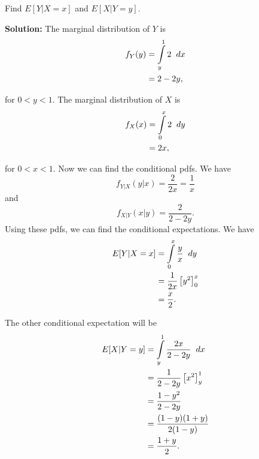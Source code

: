 \documentclass{article}
\newcommand{\mybox}{%
    \collectbox{%
        \setlength{\fboxsep}{1pt}%
        \fbox{\BOXCONTENT}%
    }%
}
\begin{document}
Find $E[Y|X=x]$ and $E[X|Y=y]$.

\vspace{5mm}

\noindent\mybox{\textbf{Solution:}}  The marginal distribution of $Y$ is
\begin{align}
f_Y(y) &= \int\limits_y^1 2 \hspace{2mm}dx \\
&= 2 - 2y,
\end{align}

\noindent for $0<y<1$.  The marginal distribution of $X$ is 
\begin{align}
f_X(x) &= \int\limits_0^x 2 \hspace{2mm} dy \\
&= 2x,
\end{align}

\noindent for $0<x<1$.  Now we can find the conditional pdfs.  We have $$f_{Y|X}(y|x) = \frac{2}{2x} = \frac{1}{x}$$ and $$f_{X|Y}(x|y) = \frac{2}{2-2y}.$$  Using these pdfs, we can find the conditional expectations.  We have
\begin{align}
E[Y|X=x] &= \int\limits_0^x \frac{y}{x} \hspace{2mm} dy \\
&= \frac{1}{2x}\left[y^2\right]^x_0 \\
&= \frac{x}{2}.
\end{align}

\noindent The other conditional expectation will be 
\begin{align}
E[X|Y=y] &= \int\limits_y^1 \frac{2x}{2-2y} \hspace{2mm} dx \\
&= \frac{1}{2-2y}\left[x^2\right]^1_y \\
&= \frac{1-y^2}{2-2y} \\
&= \frac{(1-y)(1+y)}{2(1-y)} \\
&= \frac{1+y}{2}.
\end{align}
\end{document}
